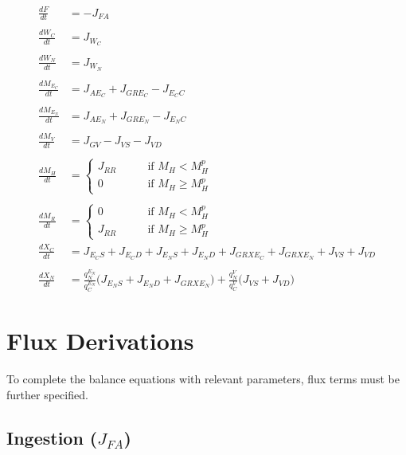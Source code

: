 \documentclass[
]{article}
\begin{document}
\begin{align}
\frac{dF}{dt} &= - J_{FA}
\\\nonumber
\\
\frac{d{W_{C}}}{dt} &= J_{W_C}
\\\nonumber
\\
\frac{d{W_{N}}}{dt} &= J_{W_N}
\\\nonumber
\\
\frac{d{M_{E_{C}}}}{dt} &= J_{AE_{C}} + J_{GR{E_C}} - J_{E_{C}C}
\\\nonumber
\\
\frac{d{M_{E_{N}}}}{dt} &= J_{AE_{N}} + J_{GR{E_N}} - J_{E_{N}C}
\\\nonumber
\\
\frac{dM_V}{dt} &= J_{GV} - J_{VS} - J_{VD}
\\\nonumber
\\
\frac{d{M_H}}{dt} &= 
\begin{cases}
J_{RR} & \qquad \text{if } {M_H} < M_{H}^{p} \\
0      & \qquad \text{if } {M_H} \ge M_{H}^{p} 
\end{cases}
\\\nonumber
\\
\frac{d{M_R}}{dt} &= 
\begin{cases}
0 & \qquad \text{if } {M_H} < M_{H}^{p} \\
J_{RR}      & \qquad \text{if } {M_H} \ge M_{H}^{p}  
\end{cases}
\\
\frac{d{X_C}}{dt} &= J_{{E_C}S} + J_{{E_C}D} + J_{{E_N}S} + J_{{E_N}D}+ J_{GRX{E_C}} + J_{GRX{E_N}} + J_{VS} + J_{VD}
\\
\\\nonumber
\frac{d{X_N}}{dt} &= \frac{q_{N}^{E_N}}{q_{C}^{E_N}}\biggr(J_{{E_N}S} + J_{{E_N}D} + J_{GRX{E_N}}\biggr) + \frac{q_{N}^{V}}{q_{C}^{V}}\biggr(J_{VS} + J_{VD}\biggr)
\end{align}

\newpage

\section{Flux Derivations}\label{flux-derivations}

To complete the balance equations with relevant parameters, flux terms
must be further specified.

\subsection{\texorpdfstring{Ingestion
(\(J_{FA}\))}{Ingestion (J\_\{FA\})}}\label{ingestion-j_fa}
\end{document}
